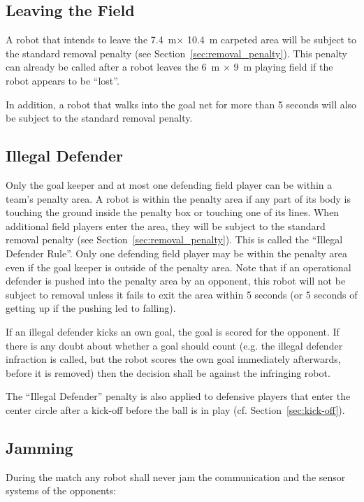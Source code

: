 \documentclass[12pt]{article}
\newcommand{\cf}{\mbox{cf.}\xspace}
\newcommand{\TotalWidth}{7.4~m\xspace}
\newcommand{\TotalLength}{10.4~m\xspace }
\begin{document}
\subsection{Leaving the Field}
\label{sec:leaving_field}

A robot that intends to leave the \TotalWidth $\times$ \TotalLength carpeted area will be subject to the standard removal penalty (see
Section~\ref{sec:removal_penalty}). This penalty can already be called after a robot leaves the 6~m $\times$ 9~m playing field if the robot appears to be ``lost''.

In addition, a robot that walks into the goal net for more than 5 seconds will also be subject to the standard removal penalty.

\subsection{Illegal Defender}
\label{sec:illegal_defender}

Only the goal keeper and at most one defending field player can be within a team's penalty area. A robot is within the penalty area if any part of its body is touching the ground inside the penalty box or touching one of its lines.  When additional field players enter the area, they will be subject to the standard removal penalty (see Section~\ref{sec:removal_penalty}). This is called the ``Illegal Defender Rule''. Only one defending field player may be within the penalty area even if the goal keeper is outside of the penalty area.  Note that if an operational defender is pushed into the penalty area by an opponent, this robot will not be subject to removal unless it fails to exit the area within 5 seconds (or 5 seconds of getting up if the pushing led to falling).

If an illegal defender kicks an own goal, the goal is scored for the opponent. If there is any doubt about whether a goal should count (e.g. the illegal defender infraction is called, but the robot scores the own goal immediately afterwards, before it is removed) then the decision shall be against the infringing robot.

The ``Illegal Defender'' penalty is also applied to defensive players that enter the center circle after a kick-off before the ball is in play (\cf Section~\ref{sec:kick-off}).

\subsection{Jamming}
\label{sec:jamming}
During the match any robot shall never jam the communication and the sensor systems of the opponents:
\end{document}
